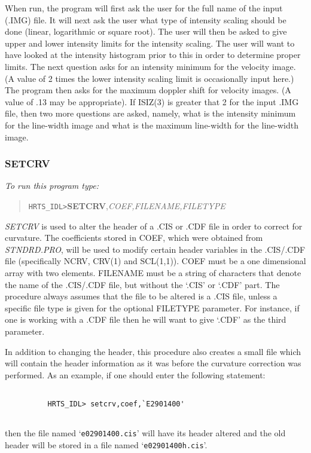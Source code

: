       When run, the program will first ask the user for the full name of
   the input (.IMG) file.  It will next ask the user what type of
   intensity scaling should be done (linear, logarithmic or square root).
   The user will then be asked to give upper and lower intensity limits
   for the intensity scaling.  The user will want to have looked at the
   intensity histogram prior to this in order to determine proper limits.
   The next question asks for an intensity minimum for the velocity image.
   (A value of 2 times the lower intensity scaling limit is occasionally
   input here.)  The program then asks for the maximum doppler shift
   for velocity images.  (A value of .13 may be appropriate).  If ISIZ(3)
   is greater that 2 for the input .IMG file, then two more questions are
   asked, namely, what is the intensity minimum for the line-width image
   and what is the maximum line-width for the line-width image.

\subsubsection{SETCRV}

{\em To run this program type:}

\begin{quote}   
     {\tt HRTS\_IDL>}{\bf SETCRV},{\it COEF,FILENAME,FILETYPE}         
\end{quote}   
{\em SETCRV} is used to alter the header of a .CIS or .CDF file in order
   to correct for curvature.  The coefficients stored in COEF, which were
   obtained from {\em STNDRD.PRO}, will be used to modify certain header
   variables in the .CIS/.CDF file (specifically NCRV, CRV(1) and
   SCL(1,1)).  COEF must be a one dimensional array with two elements.
   FILENAME must be a string of characters that denote the name of the
   .CIS/.CDF file, but without the `.CIS' or `.CDF' part.  The procedure
   always assumes that the file to be altered is a .CIS file, unless a
   specific file type is given for the optional FILETYPE parameter.  For
   instance, if one is working with a .CDF file then he will want to give
   `.CDF' as the third parameter.

      In addition to changing the header, this procedure also creates a
   small file which will contain the header information as it was before
   the curvature correction was performed.  As an example, if one should
   enter the following statement:
\begin{verbatim}   

          HRTS_IDL> setcrv,coef,`E2901400'
  
\end{verbatim}
   then the file named `{\tt e02901400.cis}' will have
   its header altered and the old header will be stored in a file named
   `{\tt e02901400h.cis}'.

